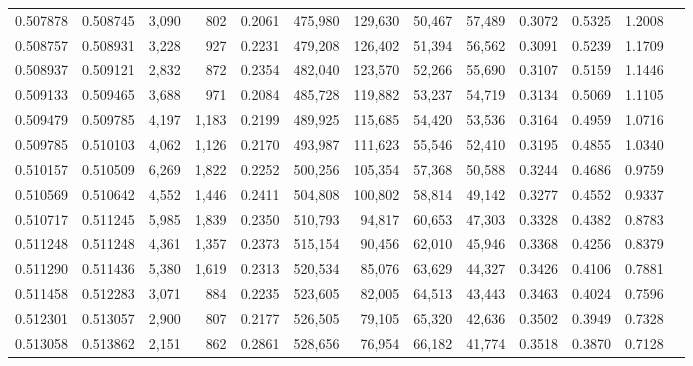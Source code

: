 \begin{tabular}{rrrrrrrrrrrrr}
0.507878 & 0.508745 &  3,090 &   802 &                                     0.2061 & 475,980 & 129,630 &  50,467 &  57,489 & 0.3072 & 0.5325 & 1.2008 \\
0.508757 & 0.508931 &  3,228 &   927 &                                     0.2231 & 479,208 & 126,402 &  51,394 &  56,562 & 0.3091 & 0.5239 & 1.1709 \\
0.508937 & 0.509121 &  2,832 &   872 &                                     0.2354 & 482,040 & 123,570 &  52,266 &  55,690 & 0.3107 & 0.5159 & 1.1446 \\
0.509133 & 0.509465 &  3,688 &   971 &                                     0.2084 & 485,728 & 119,882 &  53,237 &  54,719 & 0.3134 & 0.5069 & 1.1105 \\
0.509479 & 0.509785 &  4,197 & 1,183 &                                     0.2199 & 489,925 & 115,685 &  54,420 &  53,536 & 0.3164 & 0.4959 & 1.0716 \\
0.509785 & 0.510103 &  4,062 & 1,126 &                                     0.2170 & 493,987 & 111,623 &  55,546 &  52,410 & 0.3195 & 0.4855 & 1.0340 \\
0.510157 & 0.510509 &  6,269 & 1,822 &                                     0.2252 & 500,256 & 105,354 &  57,368 &  50,588 & 0.3244 & 0.4686 & 0.9759 \\
0.510569 & 0.510642 &  4,552 & 1,446 &                                     0.2411 & 504,808 & 100,802 &  58,814 &  49,142 & 0.3277 & 0.4552 & 0.9337 \\
0.510717 & 0.511245 &  5,985 & 1,839 &                                     0.2350 & 510,793 &  94,817 &  60,653 &  47,303 & 0.3328 & 0.4382 & 0.8783 \\
0.511248 & 0.511248 &  4,361 & 1,357 &                                     0.2373 & 515,154 &  90,456 &  62,010 &  45,946 & 0.3368 & 0.4256 & 0.8379 \\
0.511290 & 0.511436 &  5,380 & 1,619 &                                     0.2313 & 520,534 &  85,076 &  63,629 &  44,327 & 0.3426 & 0.4106 & 0.7881 \\
0.511458 & 0.512283 &  3,071 &   884 &                                     0.2235 & 523,605 &  82,005 &  64,513 &  43,443 & 0.3463 & 0.4024 & 0.7596 \\
0.512301 & 0.513057 &  2,900 &   807 &                                     0.2177 & 526,505 &  79,105 &  65,320 &  42,636 & 0.3502 & 0.3949 & 0.7328 \\
0.513058 & 0.513862 &  2,151 &   862 &                                     0.2861 & 528,656 &  76,954 &  66,182 &  41,774 & 0.3518 & 0.3870 & 0.7128 \\

\end{tabular}

